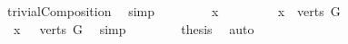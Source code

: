 \begin{isabellebody}
\ trivialComposition\ \isamarkupfalse%
\ simp\isanewline
\ \ \isamarkupfalse%
\isanewline
\ \ \ \ \isamarkupfalse%
\ x\ \ \ \isanewline
\ \ \ \ \isamarkupfalse%
\ {\isachardoublequoteopen}x\ {\isasymin}\ verts\ G{\isachardoublequoteclose}\isanewline
\ \ \ \ \isamarkupfalse%
\ \isamarkupfalse%
\ {\isachardoublequoteopen}\ x\ {\isasymin}\ {\isasymUnion}\ {\isacharbraceleft}{\kern0pt}verts\ G{\isacharbraceright}{\kern0pt}{\isachardoublequoteclose}\ \isamarkupfalse%
\ simp\isanewline
\ \ \isamarkupfalse%
\isanewline
\ \ \isamarkupfalse%
\ \isamarkupfalse%
\ {\isachardoublequoteopen}{\isacharquery}{\kern0pt}thesis{\isachardoublequoteclose}\ \isamarkupfalse%
\ auto\isanewline
{}\isamarkupfalse%
%
\endisatagproof
{\isafoldproof}%
%
\isadelimproof
\isanewline
%
\endisadelimproof
%
\isadelimtheory
%
\endisadelimtheory
%
\isatagtheory
{}\isamarkupfalse%
%
\endisatagtheory
{\isafoldtheory}%
%
\isadelimtheory
%
\endisadelimtheory
%
\end{isabellebody}%
\endinput
